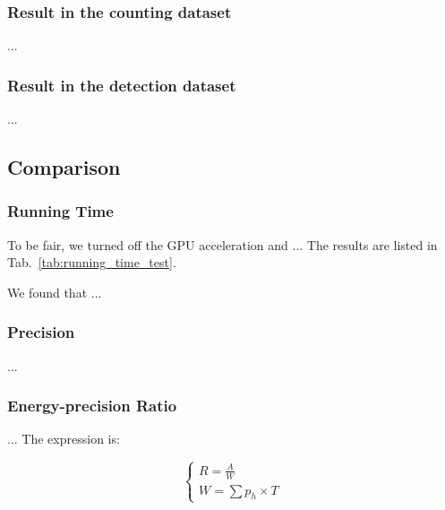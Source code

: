 \subsubsection{Result in the counting dataset}
...


\subsubsection{Result in the detection dataset}
...


\subsection{Comparison}

\subsubsection{Running Time}
To be fair, we turned off the GPU acceleration and ... The results are listed in Tab.~\ref{tab:running_time_test}.

We found that ... 

\begin{table}[htb]
\centering
\caption{Results of the running time tests}
\label{tab:running_time_test}
\end{table}


\subsubsection{Precision}
... 

\subsubsection{Energy-precision Ratio}
... The expression is:

\begin{equation}
    \left\{\begin{matrix}
    R = \frac{A}{W}  \\
    W = \sum p_h\times T
    \end{matrix}\right.
\end{equation}

